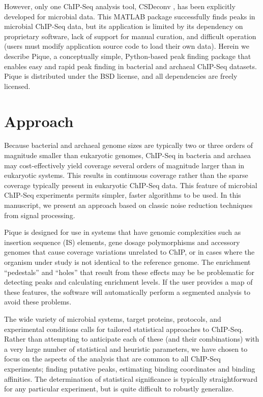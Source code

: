 However, only one ChIP-Seq analysis tool, CSDeconv \cite{CSDeconv},
has been explicitly developed for microbial data.  This MATLAB package
successfully finds peaks in microbial ChIP-Seq data, but its
application is limited by its dependency on proprietary software, lack
of support for manual curation, and difficult operation (users must
modify application source code to load their own
data). \cite{wilbanks} Herein we describe Pique, a conceptually
simple, Python-based peak finding package that enables easy and rapid
peak finding in bacterial and archaeal ChIP-Seq datasets. Pique is
distributed under the BSD license, and all dependencies are freely
licensed.

\section{Approach}

\noindent Because bacterial and archaeal genome sizes are typically
two or three orders of magnitude smaller than eukaryotic genomes,
ChIP-Seq in bacteria and archaea may cost-effectively yield coverage
several orders of magnitude larger than in eukaryotic systems. This
results in continuous coverage rather than the sparse coverage
typically present in eukaryotic ChIP-Seq data.  This feature of
microbial ChIP-Seq experiments permits simpler, faster algorithms to
be used. In this manuscript, we present an approach based on classic
noise reduction techniques from signal processing.

Pique is designed for use in systems that have genomic complexities
such as insertion sequence (IS) elements, gene dosage polymorphisms
and accessory genomes that cause coverage variations unrelated to
ChIP, or in cases where the organism under study is not identical to
the reference genome. The enrichment ``pedestals'' and ``holes'' that
result from these effects may be be problematic for detecting peaks
and calculating enrichment levels. If the user provides a map of these
features, the software will automatically perform a segmented
analysis to avoid these problems.

The wide variety of microbial systems, target proteins, protocols, and
experimental conditions calls for tailored statistical approaches to
ChIP-Seq. Rather than attempting to anticipate each of these (and
their combinations) with a very large number of statistical and
heuristic parameters, we have chosen to focus on the aspects of the
analysis that are common to all ChIP-Seq experiments; finding putative
peaks, estimating binding coordinates and binding affinities. The
determination of statistical significance is typically straightforward
for any particular experiment, but is quite difficult to robustly
generalize.

